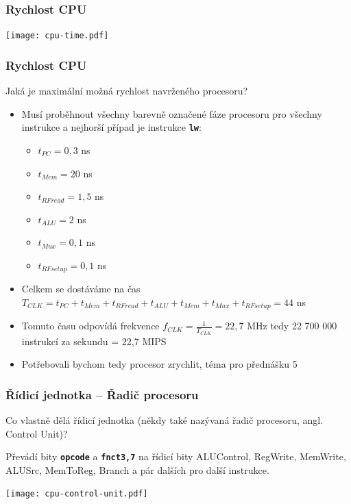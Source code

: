 \documentclass{beamer}
\begin{document}
\begin{frame}
\frametitle{Rychlost CPU}

\bigskip

\texttt{[image: cpu-time.pdf]}

\end{frame}

\begin{frame}
\frametitle{Rychlost CPU}

Jaká je maximální možná rychlost navrženého procesoru?
\begin{itemize}
\item Musí proběhnout všechny barevně označené fáze procesoru pro všechny instrukce a nejhorší případ je instrukce \texttt{\textbf{lw}}:
\begin{itemize}
\item $t_{PC} = 0,3$ ns
\item $t_{Mem} = 20$ ns
\item $t_{RFread} = 1,5$ ns
\item $t_{ALU} = 2$ ns
\item $t_{Mux} = 0,1$ ns
\item $t_{RFsetup} = 0,1$ ns
\end{itemize}
\item Celkem se dostáváme na čas $T_{CLK} = t_{PC} + t_{Mem} + t_{RFread} + t_{ALU} + t_{Mem} + t_{Mux} + t_{RFsetup} = 44$ ns 
\item Tomuto času odpovídá frekvence $f_{CLK} = \frac{1}{T_{CLK}} = 22,7$ MHz tedy 22 700 000 instrukcí za sekundu = 22,7 MIPS
\item Potřebovali bychom tedy procesor zrychlit, téma pro přednášku 5
\end{itemize}
\end{frame}


\begin{frame}
\frametitle{Řídicí jednotka -- Řadič procesoru}

Co vlastně dělá řídicí jednotka (někdy také nazývaná řadič procesoru, angl. Control Unit)?

Převádí bity \texttt{\textbf{opcode}} a \texttt{\textbf{fnct3,7}} na řídicí bity ALUControl, RegWrite, MemWrite, ALUSrc, MemToReg, Branch a pár dalších pro další instrukce.

\bigskip
\begin{center}
\texttt{[image: cpu-control-unit.pdf]}
\end{center}
\end{frame}
\end{document}
